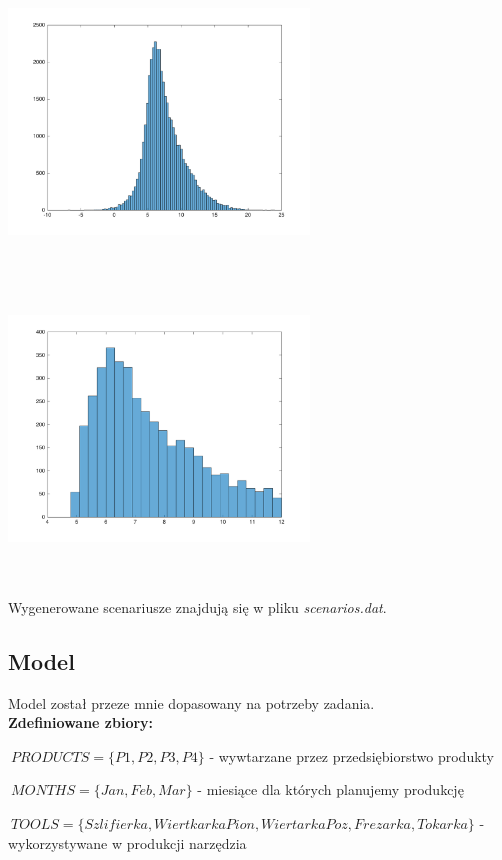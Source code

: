 \documentclass[11pt]{article} %
\begin{document}
\includegraphics[width=8cm, height=8cm]{all}
\includegraphics[width=8cm, height=8cm]{truncated}

Wygenerowane scenariusze znajdują się w pliku \emph{scenarios.dat}.

\subsection{Model}

Model został przeze mnie dopasowany na potrzeby zadania. 
\leavevmode \\

\textbf{Zdefiniowane zbiory:}

$\ PRODUCTS = \{P1, P2, P3, P4\} $ - wywtarzane przez przedsiębiorstwo produkty

$\ MONTHS = \{Jan, Feb, Mar\}  $ - miesiące dla których planujemy produkcję

$\ TOOLS = \{Szlifierka, WiertkarkaPion, WiertarkaPoz, Frezarka, Tokarka \} $ - wykorzystywane w produkcji narzędzia
\end{document}
